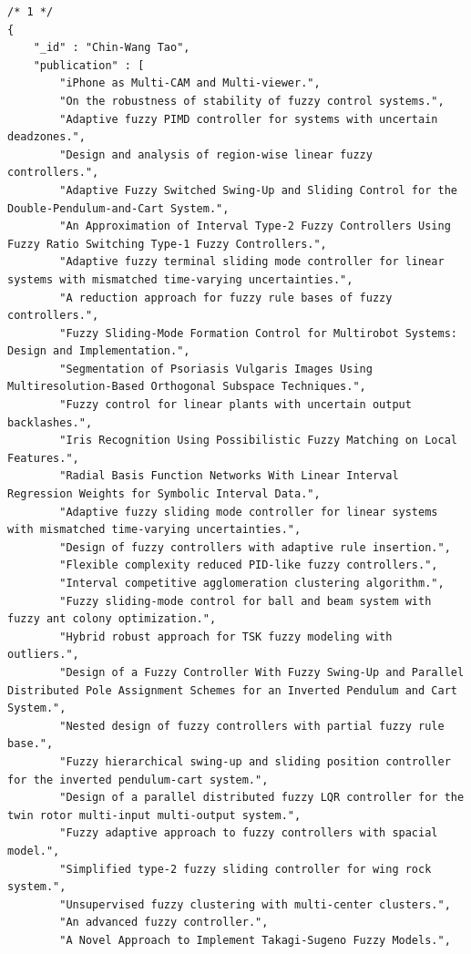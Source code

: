 \begin{verbatim}
/* 1 */
{
    "_id" : "Chin-Wang Tao",
    "publication" : [ 
        "iPhone as Multi-CAM and Multi-viewer.", 
        "On the robustness of stability of fuzzy control systems.", 
        "Adaptive fuzzy PIMD controller for systems with uncertain deadzones.", 
        "Design and analysis of region-wise linear fuzzy controllers.", 
        "Adaptive Fuzzy Switched Swing-Up and Sliding Control for the Double-Pendulum-and-Cart System.", 
        "An Approximation of Interval Type-2 Fuzzy Controllers Using Fuzzy Ratio Switching Type-1 Fuzzy Controllers.", 
        "Adaptive fuzzy terminal sliding mode controller for linear systems with mismatched time-varying uncertainties.", 
        "A reduction approach for fuzzy rule bases of fuzzy controllers.", 
        "Fuzzy Sliding-Mode Formation Control for Multirobot Systems: Design and Implementation.", 
        "Segmentation of Psoriasis Vulgaris Images Using Multiresolution-Based Orthogonal Subspace Techniques.", 
        "Fuzzy control for linear plants with uncertain output backlashes.", 
        "Iris Recognition Using Possibilistic Fuzzy Matching on Local Features.", 
        "Radial Basis Function Networks With Linear Interval Regression Weights for Symbolic Interval Data.", 
        "Adaptive fuzzy sliding mode controller for linear systems with mismatched time-varying uncertainties.", 
        "Design of fuzzy controllers with adaptive rule insertion.", 
        "Flexible complexity reduced PID-like fuzzy controllers.", 
        "Interval competitive agglomeration clustering algorithm.", 
        "Fuzzy sliding-mode control for ball and beam system with fuzzy ant colony optimization.", 
        "Hybrid robust approach for TSK fuzzy modeling with outliers.", 
        "Design of a Fuzzy Controller With Fuzzy Swing-Up and Parallel Distributed Pole Assignment Schemes for an Inverted Pendulum and Cart System.", 
        "Nested design of fuzzy controllers with partial fuzzy rule base.", 
        "Fuzzy hierarchical swing-up and sliding position controller for the inverted pendulum-cart system.", 
        "Design of a parallel distributed fuzzy LQR controller for the twin rotor multi-input multi-output system.", 
        "Fuzzy adaptive approach to fuzzy controllers with spacial model.", 
        "Simplified type-2 fuzzy sliding controller for wing rock system.", 
        "Unsupervised fuzzy clustering with multi-center clusters.", 
        "An advanced fuzzy controller.", 
        "A Novel Approach to Implement Takagi-Sugeno Fuzzy Models.", 

\end{verbatim}
